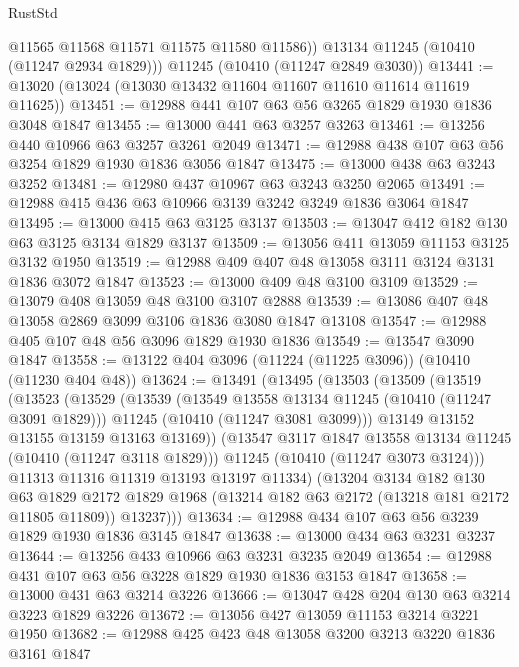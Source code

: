 \begin{lexlean}{RustStd}
\begin{coremodule}
          @11565
          @11568
          @11571
          @11575
          @11580
          @11586))
      @13134
      @11245
      (@10410 (@11247 @2934 @1829)))
    @11245
    (@10410 (@11247 @2849 @3030))
@13441 := @13020 (@13024 (@13030 @13432 @11604 @11607 @11610 @11614 @11619 @11625))
@13451 := @12988 @441 @107 @63 @56 @3265 @1829 @1930 @1836 @3048 @1847
@13455 := @13000 @441 @63 @3257 @3263
@13461 := @13256 @440 @10966 @63 @3257 @3261 @2049
@13471 := @12988 @438 @107 @63 @56 @3254 @1829 @1930 @1836 @3056 @1847
@13475 := @13000 @438 @63 @3243 @3252
@13481 := @12980 @437 @10967 @63 @3243 @3250 @2065
@13491 := @12988 @415 @436 @63 @10966 @3139 @3242 @3249 @1836 @3064 @1847
@13495 := @13000 @415 @63 @3125 @3137
@13503 := @13047 @412 @182 @130 @63 @3125 @3134 @1829 @3137
@13509 := @13056 @411 @13059 @11153 @3125 @3132 @1950
@13519 := @12988 @409 @407 @48 @13058 @3111 @3124 @3131 @1836 @3072 @1847
@13523 := @13000 @409 @48 @3100 @3109
@13529 := @13079 @408 @13059 @48 @3100 @3107 @2888
@13539 := @13086 @407 @48 @13058 @2869 @3099 @3106 @1836 @3080 @1847 @13108
@13547 := @12988 @405 @107 @48 @56 @3096 @1829 @1930 @1836
@13549 := @13547 @3090 @1847
@13558 := @13122 @404 @3096 (@11224 (@11225 @3096)) (@10410 (@11230 @404 @48))
@13624 := @13491
    (@13495
      (@13503
        (@13509
          (@13519
            (@13523
              (@13529
                (@13539
                  (@13549 @13558 @13134 @11245 (@10410 (@11247 @3091 @1829)))
                  @11245
                  (@10410 (@11247 @3081 @3099)))
                @13149
                @13152
                @13155
                @13159
                @13163
                @13169))
            (@13547 @3117 @1847 @13558 @13134 @11245 (@10410 (@11247 @3118 @1829)))
            @11245
            (@10410 (@11247 @3073 @3124)))
          @11313
          @11316
          @11319
          @13193
          @13197
          @11334)
        (@13204
          @3134
          @182
          @130
          @63
          @1829
          @2172
          @1829
          @1968
          (@13214 @182 @63 @2172 (@13218 @181 @2172 @11805 @11809))
          @13237)))
@13634 := @12988 @434 @107 @63 @56 @3239 @1829 @1930 @1836 @3145 @1847
@13638 := @13000 @434 @63 @3231 @3237
@13644 := @13256 @433 @10966 @63 @3231 @3235 @2049
@13654 := @12988 @431 @107 @63 @56 @3228 @1829 @1930 @1836 @3153 @1847
@13658 := @13000 @431 @63 @3214 @3226
@13666 := @13047 @428 @204 @130 @63 @3214 @3223 @1829 @3226
@13672 := @13056 @427 @13059 @11153 @3214 @3221 @1950
@13682 := @12988 @425 @423 @48 @13058 @3200 @3213 @3220 @1836 @3161 @1847

\end{coremodule}
\end{lexlean}

